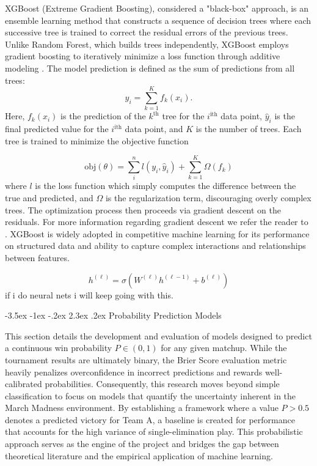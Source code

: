 \documentclass[12pt,leqno]{article}\usepackage[pdftex]{graphicx}\usepackage[usenames,dvipsnames]{xcolor}
\makeatletter
\renewcommand\section{\@startsection {section}{1}{\z@}%
{-3.5ex \@plus -1ex \@minus -.2ex}%
{2.3ex \@plus.2ex}%
{\normalfont\centering}}
\theoremstyle{remark}
\makeatother
\begin{document}
XGBoost (Extreme Gradient Boosting), considered a "black-box" approach, is an ensemble learning method that constructs a sequence of decision trees where each successive tree is trained to correct the residual errors of the previous trees. Unlike Random Forest, which builds trees independently, XGBoost employs gradient boosting to iteratively minimize a loss function through additive modeling \cite{XGBoost}. The model prediction is defined as the sum of predictions from all trees:
\begin{equation}
\hat{y}_i = \sum_{k=1}^K f_k(x_i).
\end{equation} 
Here, $f_k(x_i)$ is the prediction of the $k^{\text{th}}$ tree for the $i^{\text{ith}}$ data point, $\hat{y}_i$ is the final predicted value for the  $i^{\text{ith}}$ data point, and $K$ is the number of trees. Each tree is trained to minimize the objective function 

\begin{equation}
    \text{obj}(\theta) = \sum_{i}^n l(y_i, \hat{y}_i) + \sum_{k=1}^K \Omega(f_k)
\end{equation}
where $l$ is the loss function which simply computes the difference between the true and predicted, and $\Omega$ is the regularization term, discouraging overly complex trees. The optimization process then proceeds via gradient descent on the residuals. For more information regarding gradient descent we refer the reader to \cite{GD}. XGBoost is widely adopted in competitive machine learning for its performance on structured data and ability to capture complex interactions and relationships between features. 

\begin{equation}
h^{(\ell)} = \sigma\left(W^{(\ell)} h^{(\ell-1)} + b^{(\ell)}\right)
\end{equation}
if i do neural nets i will keep going with this. 
\newpage

\begin{center}
\section{Probability Prediction Models}
\end{center}
\thispagestyle{empty} %
This section details the development and evaluation of models designed to predict a continuous win probability $P \in (0, 1)$ for any given matchup.  While the tournament results are ultimately binary, the Brier Score evaluation metric heavily penalizes overconfidence in incorrect predictions and rewards well-calibrated probabilities. Consequently, this research moves beyond simple classification to focus on models that quantify the uncertainty inherent in the March Madness environment. By establishing a framework where a value $P > 0.5$ denotes a predicted victory for Team A, a baseline is created for performance that accounts for the high variance of single-elimination play. This probabilistic approach serves as the engine of the project and bridges the gap between theoretical literature and the empirical application of machine learning.
\end{document}
